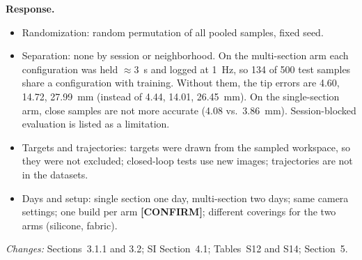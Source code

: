 \textbf{Response.} \begin{itemize}
\item Randomization: random permutation of all pooled samples, fixed seed.
\item Separation: none by session or neighborhood. On the multi-section arm each configuration was held $\approx 3$~s and logged at 1~Hz, so 134 of 500 test samples share a configuration with training. Without them, the tip errors are 4.60, 14.72, 27.99~mm (instead of 4.44, 14.01, 26.45~mm). On the single-section arm, close samples are not more accurate (4.08 vs.\ 3.86~mm). Session-blocked evaluation is listed as a limitation.
\item Targets and trajectories: targets were drawn from the sampled workspace, so they were not excluded; closed-loop tests use new images; trajectories are not in the datasets.
\item Days and setup: single section one day, multi-section two days; same camera settings; one build per arm \textbf{[CONFIRM]}; different coverings for the two arms (silicone, fabric).
\end{itemize}

\textit{Changes:} Sections~3.1.1 and 3.2; SI Section~4.1; Tables~S12 and S14; Section~5.
